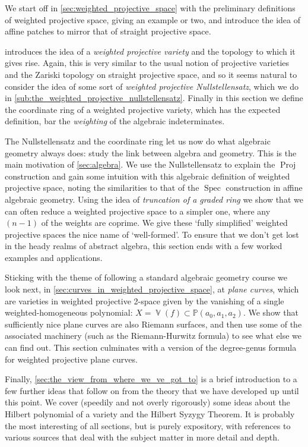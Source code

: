 \documentclass[10pt,notitlepage]{article}
\numberwithin{equation}{subsection}
\DeclareMathOperator{\spec}{Spec}
\DeclareMathOperator{\proj}{Proj}
\DeclareMathOperator{\van}{\mathbb{V}}
\newcommand{\pee}{\mathbb{P}}
\begin{document}
    We start off in \cref{sec:weighted_projective_space} with the preliminary definitions of weighted projective space, giving an example or two, and introduce the idea of affine patches to mirror that of straight projective space.

     introduces the idea of a \emph{weighted projective variety} and the topology to which it gives rise.
    Again, this is very similar to the usual notion of projective varieties and the Zariski topology on straight projective space, and so it seems natural to consider the idea of some sort of \emph{weighted projective Nullstellensatz}, which we do in \cref{sub:the_weighted_projective_nullstellensatz}.
    Finally in this section we define the coordinate ring of a weighted projective variety, which has the expected definition, bar the \emph{weighting} of the algebraic indeterminates.

    The Nullstellensatz and the coordinate ring let us now do what algebraic geometry always does: study the link between algebra and geometry.
    This is the main motivation of \cref{sec:algebra}.
    We use the Nullstellensatz to explain the $\proj$ construction and gain some intuition with this algebraic definition of weighted projective space, noting the similarities to that of the $\spec$ construction in affine algebraic geometry.
    Using the idea of \emph{truncation of a graded ring} we show that we can often reduce a weighted projective space to a simpler one, where any $(n-1)$ of the weights are coprime.
    We give these `fully simplified' weighted projective spaces the nice name of `well-formed'.
    To ensure that we don't get lost in the heady realms of abstract algebra, this section ends with a few worked examples and applications.

    Sticking with the theme of following a standard algebraic geometry course we look next, in \cref{sec:curves_in_weighted_projective_space}, at \emph{plane curves}, which are varieties in weighted projective 2-space given by the vanishing of a single weighted-homogeneous polynomial: $X=\van(f)\subset\pee(a_0,a_1,a_2)$.
    We show that sufficiently nice plane curves are also Riemann surfaces, and then use some of the associated machinery (such as the Riemann-Hurwitz formula) to see what else we can find out.
    This section culminates with a version of the degree-genus formula for weighted projective plane curves.

    Finally, \cref{sec:the_view_from_where_we_ve_got_to} is a brief introduction to a few further ideas that follow on from the theory that we have developed up until this point.
    We cover (speedily and not overly rigorously) some ideas about the Hilbert polynomial of a variety and the Hilbert Syzygy Theorem.
    It is probably the most interesting of all sections, but is purely expository, with references to various sources that deal with the subject matter in more detail and depth.
    
\end{document}

